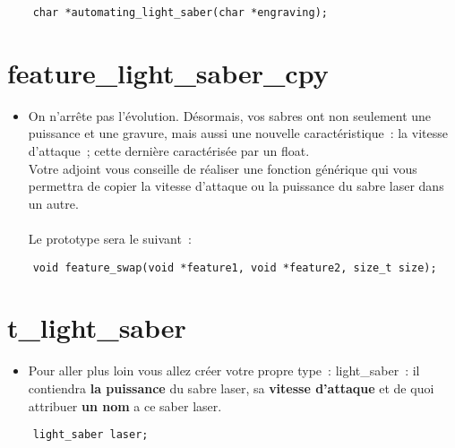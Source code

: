 \documentclass{koala-en}
\begin{document}
\begin{lstlisting}
	char *automating_light_saber(char *engraving);
\end{lstlisting}
\newpage

\chapter{feature\_light\_saber\_cpy}

\begin{itemize}
	\item	On n'arrête pas l'évolution. Désormais, vos sabres ont non seulement une puissance et une gravure, mais aussi une nouvelle caractéristique~: la vitesse d'attaque~;
		cette dernière caractérisée par un float.\\
		Votre adjoint vous conseille de réaliser une fonction générique qui vous permettra de copier la vitesse d'attaque ou la puissance du sabre laser dans un autre.\\\\
		Le prototype sera le suivant~:
\end{itemize}

\begin{lstlisting}
	void feature_swap(void *feature1, void *feature2, size_t size);
\end{lstlisting}


\newpage

\chapter{t\_light\_saber}


\begin{itemize}
	\item	Pour aller plus loin vous allez créer votre propre type~: light\_saber~:
		il contiendra \textbf{la puissance} du sabre laser, sa \textbf{vitesse d'attaque} et de quoi attribuer \textbf{un nom} a ce saber laser.
\end{itemize}

\begin{lstlisting}
	light_saber laser;
\end{lstlisting}
\end{document}
